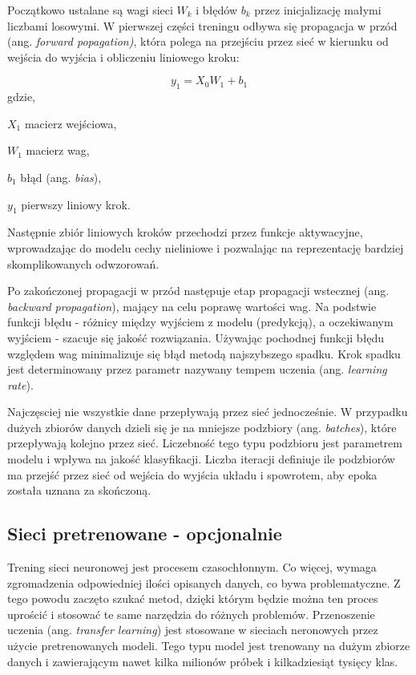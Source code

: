 Początkowo ustalane są wagi sieci $W_k$ i błędów $b_k$ przez inicjalizację małymi liczbami losowymi. W pierwszej części treningu odbywa się propagacja w przód (ang. \textit{forward popagation)}, która polega na przejściu przez sieć w kierunku od wejścia do wyjścia i obliczeniu liniowego kroku:

\begin{equation}
y_1 = X_0 W_1 + b_1
\end{equation}
gdzie,
\begin{eqwhere}[2cm]
	\item[$X_1$] macierz wejściowa,
	\item[$W_1$] macierz wag,
	\item[$b_1$] błąd (ang. \textit{bias}),
	\item[$y_1$] pierwszy liniowy krok.
\end{eqwhere}

Następnie zbiór liniowych kroków przechodzi przez funkcje aktywacyjne, wprowadzając do modelu cechy nieliniowe i pozwalając na reprezentację bardziej skomplikowanych odwzorowań.

Po zakończonej propagacji w przód następuje etap propagacji wstecznej (ang. \textit{backward propagation}), mający na celu poprawę wartości wag. Na podstwie funkcji błędu - różnicy między wyjściem z modelu (predykcją), a oczekiwanym wyjściem - szacuje się jakość rozwiązania. Używając pochodnej funkcji błędu względem wag minimalizuje się błąd metodą najszybszego spadku. Krok spadku jest determinowany przez parametr nazywany tempem uczenia (ang. \textit{learning rate}). 

Najczęsciej nie wszystkie dane przepływają przez sieć jednocześnie. W przypadku dużych zbiorów danych dzieli się je na mniejsze podzbiory (ang. \textit{batches}), które przepływają kolejno przez sieć. Liczebność tego typu podzbioru jest parametrem modelu i wpływa na jakość klasyfikacji. Liczba iteracji definiuje ile podzbiorów ma przejść przez sieć od wejścia do wyjścia układu i spowrotem, aby epoka została uznana za skończoną. 

\subsection{Sieci pretrenowane - opcjonalnie}

Trening sieci neuronowej jest procesem czasochłonnym. Co więcej, wymaga zgromadzenia odpowiedniej ilości opisanych danych, co bywa problematyczne. Z tego powodu zaczęto szukać metod, dzięki którym będzie można ten proces uprościć i stosować te same narzędzia do różnych problemów. Przenoszenie uczenia (ang. \textit{transfer learning}) jest stosowane w sieciach neronowych przez użycie pretrenowanych modeli. Tego typu model jest trenowany na dużym zbiorze danych i zawierającym nawet kilka milionów próbek i kilkadziesiąt tysięcy klas. 

